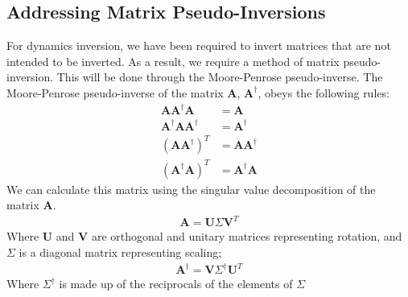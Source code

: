 \documentclass[journal]{IEEEtran}
\begin{document}
\subsection{Addressing Matrix Pseudo-Inversions}

For dynamics inversion, we have been required to invert matrices that are not intended to be inverted. 
As a result, we require a method of matrix pseudo-inversion. This will be done through the Moore-Penrose pseudo-inverse. 
The Moore-Penrose pseudo-inverse of the matrix $\mathbf{A}$, $\mathbf{A}^{\dagger}$, obeys the following rules:
\begin{align}
\mathbf{A}\mathbf{A}^{\dagger}\mathbf{A} &= \mathbf{A} \\
\mathbf{A}^{\dagger}\mathbf{A}\mathbf{A}^{\dagger} &= \mathbf{A}^{\dagger} \\
(\mathbf{A}\mathbf{A}^{\dagger})^{T} &= \mathbf{A}\mathbf{A}^{\dagger} \\
(\mathbf{A}^{\dagger}\mathbf{A})^{T} &= \mathbf{A}^{\dagger}\mathbf{A}
\end{align}
We can calculate this matrix using the singular value decomposition of the matrix $\mathbf{A}$.
\begin{align}
\mathbf{A} = \mathbf{U}\Sigma\mathbf{V}^{T}
\end{align}
Where $\mathbf{U}$ and $\mathbf{V}$ are orthogonal and unitary matrices representing rotation, and $\Sigma$ 
is a diagonal matrix representing scaling;
\begin{align}
\mathbf{A}^{\dagger} = \mathbf{V}\Sigma^{\dagger}\mathbf{U}^{T}
\end{align}
Where $\Sigma^{\dagger}$ is made up of the reciprocals of the elements of $\Sigma$
\end{document}
